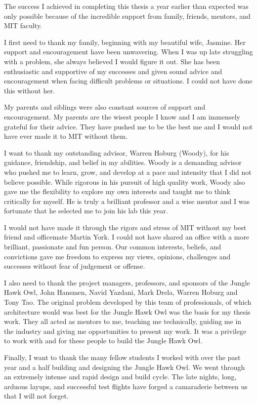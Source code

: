\begin{singlespace}
The success I achieved in completing this thesis a year earlier than expected was only possible because of the incredible support from family, friends, mentors, and MIT faculty.

I first need to thank my family, beginning with my beautiful wife, Jasmine.  
Her support and encouragement have been unwavering.  
When I was up late struggling with a problem, she always believed I would figure it out.  
She has been enthusiastic and supportive of my successes and given sound advice and encouragement when facing difficult problems or situations. 
I could not have done this without her. 

My parents and siblings were also constant sources of support and encouragement. 
My parents are the wisest people I know and I am immensely grateful for their advice.  
They have pushed me to be the best me and I would not have ever made it to MIT without them. 

I want to thank my outstanding advisor, Warren Hoburg (Woody), for his guidance, friendship, and belief in my abilities.  
Woody is a demanding advisor who pushed me to learn, grow, and develop at a pace and intensity that I did not believe possible. 
While rigorous in his pursuit of high quality work, Woody also gave me the flexibility to explore my own interests and taught me to think critically for myself.
He is truly a brilliant professor and a wise mentor and I was fortunate that he selected me to join his lab this year. 

I would not have made it through the rigors and stress of MIT without my best friend and officemate Martin York. 
I could not have shared an office with a more brilliant, passionate and fun person. 
Our common interests, beliefs, and convictions gave me freedom to express my views, opinions, challenges and successes without fear of judgement or offense. 

I also need to thank the project managers, professors, and sponsors of the Jungle Hawk Owl, John Hansmen, Navid Yazdani, Mark Drela, Warren Hoburg and Tony Tao. 
The original problem developed by this team of professionals, of which architecture would was best for the Jungle Hawk Owl was the basis for my thesis work.
They all acted as mentors to me, teaching me technically, guiding me in the industry and giving me opportunities to present my work. 
It was a privilege to work with and for these people to build the Jungle Hawk Owl.

Finally, I want to thank the many fellow students I worked with over the past year and a half building and designing the Jungle Hawk Owl.  
We went through an extremely intense and rapid design and build cycle. 
The late nights, long, arduous layups, and successful test flights have forged a camaraderie between us that I will not forget. 
\end{singlespace}

